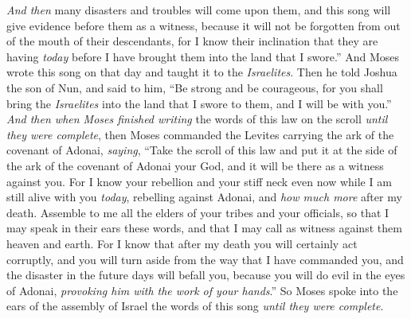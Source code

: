 \begin{biblechapter}
\verse \textit{And then} many disasters and troubles will come upon them, and this song will give evidence before them as a witness, because it will not be forgotten from out of the mouth of their descendants, for I know their inclination that they are having \textit{today} before I have brought them into the land that I swore.”
\verse And Moses wrote this song on that day and taught it to the \textit{Israelites}.
\verse Then he told Joshua the son of Nun, and said to him, “Be strong and be courageous, for you shall bring the \textit{Israelites} into the land that I swore to them, and I will be with you.”
\verse \textit{And then when Moses finished writing} the words of this law on the scroll \textit{until they were complete},
\verse then Moses commanded the Levites carrying the ark of the covenant of Adonai, \textit{saying},
\verse “Take the scroll of this law and put it at the side of the ark of the covenant of Adonai your God, and it will be there as a witness against you.
\verse For I know your rebellion and your stiff neck even now while I am still alive with you \textit{today}, rebelling against Adonai, and \textit{how much more} after my death.
\verse Assemble to me all the elders of your tribes and your officials, so that I may speak in their ears these words, and that I may call as witness against them heaven and earth.
\verse For I know that after my death you will certainly act corruptly, and you will turn aside from the way that I have commanded you, and the disaster in the future days will befall you, because you will do evil in the eyes of Adonai, \textit{provoking him with the work of your hands}.”
\verse So Moses spoke into the ears of the assembly of Israel the words of this song \textit{until they were complete}.
\end{biblechapter}

